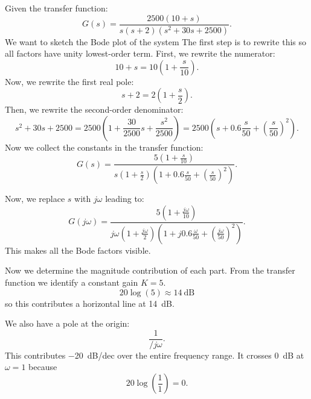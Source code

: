 \begin{exa}
  Given the transfer function:
  \begin{equation*}
    G(s) = \frac{2500 (10 + s)}{s(s+2) \left( s^2 + 30s + 2500 \right)}
  .\end{equation*}
  We want to sketch the Bode plot of the system
  \tcblower
  The first step is to rewrite this so all factors have unity lowest-order term.
  First, we rewrite the numerator:
  \begin{equation*}
    10 + s = 10 \left( 1 + \frac{s}{10} \right)
  .\end{equation*}
  Now, we rewrite the first real pole:
  \begin{equation*}
    s + 2 = 2 \left( 1 + \frac{s}{2} \right)
  .\end{equation*}
  Then, we rewrite the second-order denominator:
  \begin{equation*}
    s^2 + 30s + 2500 = 2500 \left( 1 + \frac{30}{2500}s + \frac{s^2}{2500} \right) = 2500 \left( s + \num{0,6} \frac{s}{50} + \left( \frac{s}{50} \right)^2 \right)
  .\end{equation*}
  Now we collect the constants in the transfer function:
  \begin{equation*}
    G(s) = \frac{5  \left( 1 + \frac{s}{10} \right)}{s \left( 1 + \frac{s}{2} \right) \left( 1 + \num{0,6} \frac{s}{50} + \left( \frac{s}{50} \right)^2 \right)}
  .\end{equation*}
  
  Now, we replace $s$ with $j\omega$ leading to:
  \begin{equation*}
    G(j\omega) = \frac{5 \left( 1 + \frac{j\omega}{10} \right)}{j\omega \left( 1 + \frac{j\omega}{2} \right) \left( 1 + j \num{0,6} \frac{\omega}{50} + \left( \frac{j \omega}{50} \right)^2 \right)}
  .\end{equation*}
  This makes all the Bode factors visible.

  Now we determine the magnitude contribution of each part.
  From the transfer function we identify a constant gain $K = 5$.
  \begin{equation*}
    20 \log(5) \approx \qty{14}{\dB} 
  \end{equation*}
  so this contributes a horizontal line at \qty{14}{\dB}.

  We also have a pole at the origin:
  \begin{equation*}
    \frac{1}{/j\omega}
  .\end{equation*}
  This contributes \qty{-20}{\dB/dec} over the entire frequency range.
  It crosses \qty{0}{\dB} at $\omega = 1$ because
  \begin{equation*}
    20 \log \left( \frac{1}{1} \right) = 0
  .\end{equation*}
  

\end{exa}
